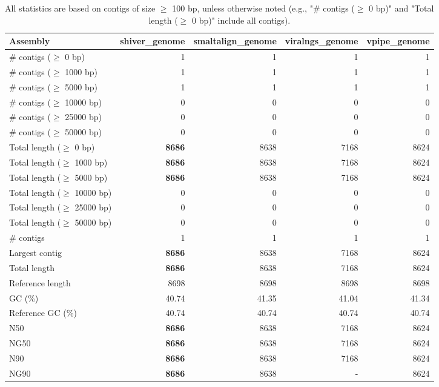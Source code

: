 \documentclass[12pt,a4paper]{article}
\begin{document}
\begin{table}[ht]
\begin{center}
\caption{All statistics are based on contigs of size $\geq$ 100 bp, unless otherwise noted (e.g., "\# contigs ($\geq$ 0 bp)" and "Total length ($\geq$ 0 bp)" include all contigs).}
\begin{tabular}{|l*{4}{|r}|}
\hline
Assembly & shiver\_genome & smaltalign\_genome & viralngs\_genome & vpipe\_genome \\ \hline
\# contigs ($\geq$ 0 bp) & 1 & 1 & 1 & 1 \\ \hline
\# contigs ($\geq$ 1000 bp) & 1 & 1 & 1 & 1 \\ \hline
\# contigs ($\geq$ 5000 bp) & 1 & 1 & 1 & 1 \\ \hline
\# contigs ($\geq$ 10000 bp) & 0 & 0 & 0 & 0 \\ \hline
\# contigs ($\geq$ 25000 bp) & 0 & 0 & 0 & 0 \\ \hline
\# contigs ($\geq$ 50000 bp) & 0 & 0 & 0 & 0 \\ \hline
Total length ($\geq$ 0 bp) & {\bf 8686} & 8638 & 7168 & 8624 \\ \hline
Total length ($\geq$ 1000 bp) & {\bf 8686} & 8638 & 7168 & 8624 \\ \hline
Total length ($\geq$ 5000 bp) & {\bf 8686} & 8638 & 7168 & 8624 \\ \hline
Total length ($\geq$ 10000 bp) & 0 & 0 & 0 & 0 \\ \hline
Total length ($\geq$ 25000 bp) & 0 & 0 & 0 & 0 \\ \hline
Total length ($\geq$ 50000 bp) & 0 & 0 & 0 & 0 \\ \hline
\# contigs & 1 & 1 & 1 & 1 \\ \hline
Largest contig & {\bf 8686} & 8638 & 7168 & 8624 \\ \hline
Total length & {\bf 8686} & 8638 & 7168 & 8624 \\ \hline
Reference length & 8698 & 8698 & 8698 & 8698 \\ \hline
GC (\%) & 40.74 & 41.35 & 41.04 & 41.34 \\ \hline
Reference GC (\%) & 40.74 & 40.74 & 40.74 & 40.74 \\ \hline
N50 & {\bf 8686} & 8638 & 7168 & 8624 \\ \hline
NG50 & {\bf 8686} & 8638 & 7168 & 8624 \\ \hline
N90 & {\bf 8686} & 8638 & 7168 & 8624 \\ \hline
NG90 & {\bf 8686} & 8638 & - & 8624 \\ \hline

\end{tabular}
\end{center}
\end{table}
\end{document}
